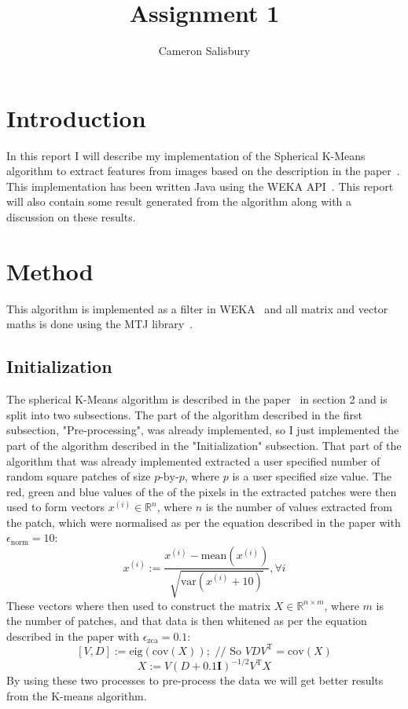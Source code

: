 \documentclass{article}
\begin{document}
\title{Assignment 1}
\author{Cameron Salisbury}

\maketitle

\section{Introduction}

In this report I will describe my implementation of the Spherical K-Means algorithm to extract features from images based on the description in the paper~\cite{paper}. This implementation has been written Java using the WEKA API~\cite{weka}. This report will also contain some result generated from the algorithm along with a discussion on these results.

\section{Method}

This algorithm is implemented as a filter in WEKA~\cite{weka} and all matrix and vector maths is done using the MTJ library~\cite{matrix_lib}.

\subsection{Initialization}

The spherical K-Means algorithm is described in the paper~\cite{paper} in section 2 and is  split into two subsections. The part of the algorithm described in the first subsection, "Pre-processing", was already implemented, so I just implemented the part of the algorithm described in the "Initialization" subsection. That part of the algorithm that was already implemented extracted a user specified number of random square patches of size $p\textrm{-by-}p$, where $p$ is a user specified size value. The red, green and blue values of the of the pixels in the extracted patches were then used to form vectors $x^{(i)} \in \mathbb{R}^n$, where $n$ is the number of values extracted from the patch, which were normalised as per the equation described in the paper with $\epsilon_{\mathrm{norm}}=10$:
\[
x^{(i)} := \frac{x^{(i)} - \mathrm{mean} \left( x^{(i)} \right) }{\sqrt{\mathrm{var} \left( x^{(i)} + 10 \right) }}, \forall i
\]
These vectors where then used to construct the matrix $X \in \mathbb{R}^{n \times m}$, where $m$ is the number of patches, and that data is then whitened as per the equation described in the paper with $\epsilon_{\mathrm{zca}}=0.1$:
\[
[V,D] := \mathrm{eig} \left( \mathrm{cov} \left( X \right) \right) ; \textrm{ // So } VDV^{\mathrm{T}} = \mathrm{cov} \left( X \right)
\]\[
X := V \left( D + 0.1 \boldsymbol{I} \right) ^{-1/2} V^{\mathrm{T}} X
\]
By using these two processes to pre-process the data we will get better results from the K-means algorithm.
\end{document}
